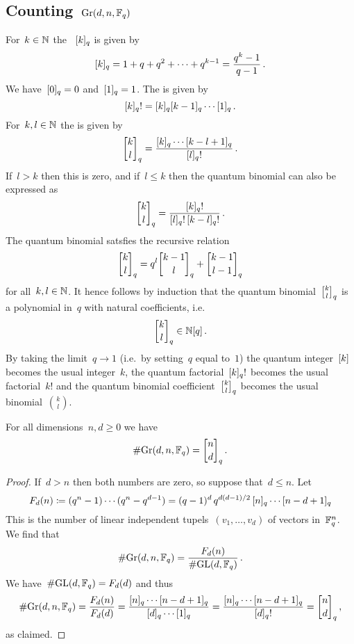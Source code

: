 \documentclass[a4paper, 11pt, twoside=semi]{scrartcl}
\begin{document}
\subsection{Counting~$\operatorname{Gr}(d, n, \mathbb{F}_q)$}

\begin{recall}
  For~$k \in \mathbb{N}$ the ~$[k]_q$ is given by
  \[
    [k]_q
    =
    1 + q + q^2 + \dotsb + q^{k-1}
    =
    \frac{q^k - 1}{q - 1} \,.
  \]
  We have~$[0]_q = 0$ and~$[1]_q = 1$.
  The  is given by
  \[
    [k]_q !
    =
    [k]_q [k-1]_q \dotsm [1]_q \,.
  \]
  For~$k, l \in \mathbb{N}$ the  is given by
  \[
    \qbinom{k}{l}_q
    =
    \frac{\qnum{k}_q \dotsm \qnum{k-l+1}_q}{\qnum{l}_q!} \,.
  \]
  If~$l > k$ then this is zero, and if~$l \leq k$ then the quantum binomial can also be expressed as
  \[
    \qbinom{k}{l}_q
    =
    \frac{\qnum{k}_q!}{\qnum{l}_q! \, \qnum{k-l}_q!} \,.
  \]
  The quantum binomial satsfies the recursive relation
  \[
    \qbinom{k}{l}_q
    =
    q^l \qbinom{k-1}{l}_q
    +
    \qbinom{k-1}{l-1}_q
  \]
  for all~$k, l \in \mathbb{N}$.
  It hence follows by induction that the quantum binomial~$\qbinom{k}{l}_q$ is a polynomial in~$q$ with natural coefficients, i.e.
  \[
    \qbinom{k}{l}_q
    \in
    \Natural[q] \,.
  \]
  By taking the limit~$q \to 1$ (i.e.\ by setting~$q$ equal to~$1$) the quantum integer~$[k]$ becomes the usual integer~$k$, the quantum factorial~$[k]_q!$ becomes the usual factorial~$k!$ and the quantum binomial coefficient~$\qbinom{k}{l}_q$ becomes the usual binomial~$\binom{k}{l}$.
\end{recall}

\begin{lemma}
  \label{size of quantum grassmannian}
  For all dimensions~$n, d \geq 0$ we have
  \[
    \counting {\Gr(d, n, \Finite_q)}
    =
    \qbinom{n}{d}_q \,.
  \]
\end{lemma}

\begin{proof}
  If~$d > n$ then both numbers are zero, so suppose that~$d \leq n$.  
  Let
  \[
    F_d(n)
    \coloneqq
    (q^n - 1) \dotsm (q^n - q^{d-1})
    =
    (q-1)^d \, q^{d(d-1)/2} \, [n]_q \dotsm [n-d+1]_q
  \]
  This is the number of linear independent tupels~$(v_1, \dotsc, v_d)$ of vectors in~$\mathbb{F}_q^n$.
  We find that
  \[
    \# {\operatorname{Gr}(d, n, \mathbb{F}_q)}
    =
    \frac{ F_d(n) }{ \# {\operatorname{GL}(d, \mathbb{F}_q)} } \,.
  \]
  We have~$\# {\operatorname{GL}(d, \mathbb{F}_q)} = F_d(d)$ and thus
  \[
    \counting {\Gr(d, n, \Finite_q)}
    =
    \frac{ F_d(n) }{ F_d(d) }
    =
    \frac{ \qnum{n}_q \dotsm \qnum{n-d+1}_q }{ \qnum{d}_q \dotsm  \qnum{1}_q }
    =
    \frac{ \qnum{n}_q \dotsm \qnum{n-d+1}_q }{ \qnum{d}_q! }
    =
    \qbinom{n}{d}_q \,,
  \]
  as claimed.
\end{proof}
\end{document}
